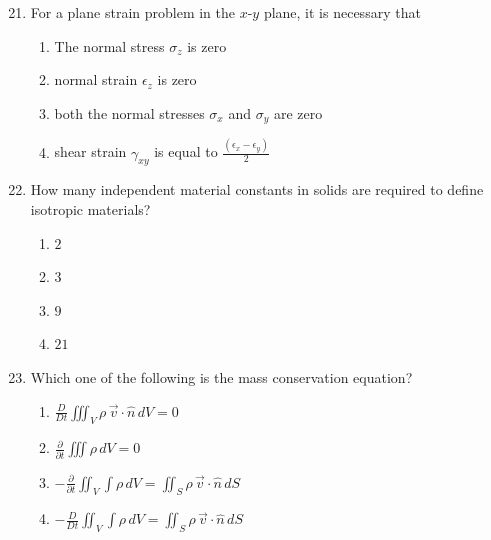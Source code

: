 \documentclass[journal]{IEEEtran}
\theoremstyle{remark}
\begin{document}
\newpage
\vspace*{0.25cm}

\begin{enumerate}[itemsep=1em]
\setcounter{enumi}{20}
\item For a plane strain problem in the $x$-$y$ plane, it is necessary that 
\begin{enumerate}[leftmargin=2.5em, labelsep=0.5em, itemsep=0.5em]
      \item The normal stress $\sigma_z$ is zero
      \item normal strain $\epsilon_z$ is zero
      \item both the normal stresses $\sigma_x$ and $\sigma_y$ are zero
      \item shear strain $\gamma_{xy}$ is equal to $\frac{(\epsilon_x-\epsilon_y)}{2}$

\end{enumerate}
\end{enumerate}

\begin{enumerate}[itemsep=1em]
\setcounter{enumi}{21}
\item How many independent material constants in solids are required to define isotropic materials? 
\begin{multicols}{4}
\begin{enumerate}
      \item $2$
      \item $3$
      \item $9$  
      \item $21$
\end{enumerate}
\end{multicols}
\end{enumerate}

\begin{enumerate}[itemsep=1em]
\setcounter{enumi}{22}
\item Which one of the following is the mass conservation equation?
\begin{enumerate}[leftmargin=2.5em, labelsep=0.5em, itemsep=0.5em]
    \item $\frac{D}{Dt} \iiint_{V} \rho \, \overrightarrow{v} \cdot \hat{n} \, dV = 0$
    \item $\frac{\partial}{\partial t} \iiint \rho \, dV = 0 $
    \item $-\frac{\partial}{\partial t} \iint_{V} \!\!\int \rho \, dV 
        = \iint_{S} \rho \, \vec{v} \cdot \hat{n} \, dS $ 
    \item  $-\frac{D}{Dt} \iint_{V} \!\!\int \rho \, dV 
  = \iint_{S} \rho \, \vec{v} \cdot \hat{n} \, dS $ 
  
      
\end{enumerate}
\end{enumerate}
\end{document}
